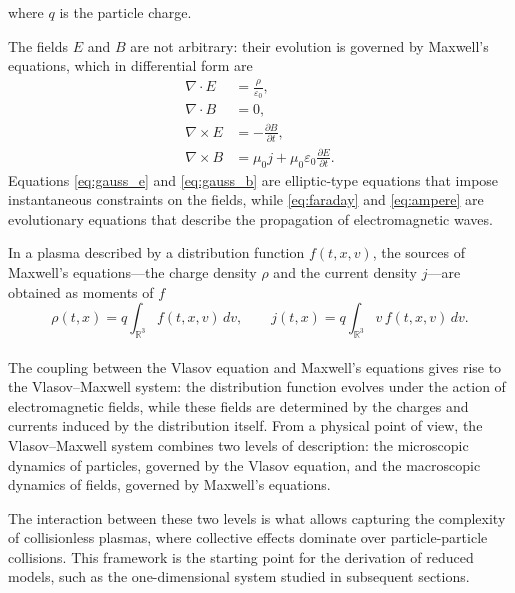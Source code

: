 \documentclass[11pt,a4paper,twoside,pdf]{article}
\numberwithin{equation}{section}
\begin{document}
where $q$ is the particle charge.



The fields $E$ and $B$ are not arbitrary: their evolution is governed by Maxwell's equations, which in differential form are
\begin{align}
\nabla \cdot E &= \frac{\rho}{\varepsilon_0}, \label{eq:gauss_e}\\
\nabla \cdot B &= 0, \label{eq:gauss_b}\\
\nabla \times E &= -\frac{\partial B}{\partial t}, \label{eq:faraday}\\
\nabla \times B &= \mu_0 j + \mu_0 \varepsilon_0 \frac{\partial E}{\partial t}. \label{eq:ampere}
\end{align}
Equations \eqref{eq:gauss_e} and \eqref{eq:gauss_b} are elliptic-type equations that impose instantaneous constraints on the fields, while \eqref{eq:faraday} and \eqref{eq:ampere} are evolutionary equations that describe the propagation of electromagnetic waves.


In a plasma described by a distribution function $f(t,x,v)$, the sources of Maxwell's equations—the charge density $\rho$ and the current density $j$—are obtained as moments of $f$
\begin{equation}
\rho(t,x) = q \int_{\mathbb{R}^3} f(t,x,v)\,dv,
\qquad
j(t,x) = q \int_{\mathbb{R}^3} v\, f(t,x,v)\,dv.
\label{eq:rho_J}
\end{equation}
\\


\newpage
The coupling between the Vlasov equation and Maxwell's equations gives rise to the Vlasov--Maxwell system: the distribution function evolves under the action of electromagnetic fields, while these fields are determined by the charges and currents induced by the distribution itself. From a physical point of view, the Vlasov--Maxwell system combines two levels of description: the microscopic dynamics of particles, governed by the Vlasov equation, and the macroscopic dynamics of fields, governed by Maxwell's equations.\newline

The interaction between these two levels is what allows capturing the complexity of collisionless plasmas, where collective effects dominate over particle-particle collisions. This framework is the starting point for the derivation of reduced models, such as the one-dimensional system studied in subsequent sections.


\end{document}
